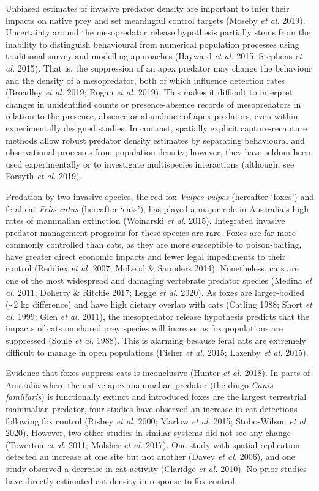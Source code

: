 \documentclass[]{elsarticle} %
\begin{document}
Unbiased estimates of invasive predator density are important to infer their impacts on native prey and set meaningful control targets (Moseby \emph{et al.} 2019). Uncertainty around the mesopredator release hypothesis partially stems from the inability to distinguish behavioural from numerical population processes using traditional survey and modelling approaches (Hayward \emph{et al.} 2015; Stephens \emph{et al.} 2015). That is, the suppression of an apex predator may change the behaviour and the density of a mesopredator, both of which influence detection rates (Broadley \emph{et al.} 2019; Rogan \emph{et al.} 2019). This makes it difficult to interpret changes in unidentified counts or presence-absence records of mesopredators in relation to the presence, absence or abundance of apex predators, even within experimentally designed studies. In contrast, spatially explicit capture-recapture methods allow robust predator density estimates by separating behavioural and observational processes from population density; however, they have seldom been used experimentally or to investigate multispecies interactions (although, see Forsyth \emph{et al.} 2019).

Predation by two invasive species, the red fox \emph{Vulpes vulpes} (hereafter `foxes') and feral cat \emph{Felis catus} (hereafter `cats'), has played a major role in Australia's high rates of mammalian extinction (Woinarski \emph{et al.} 2015). Integrated invasive predator management programs for these species are rare. Foxes are far more commonly controlled than cats, as they are more susceptible to poison-baiting, have greater direct economic impacts and fewer legal impediments to their control (Reddiex \emph{et al.} 2007; McLeod \& Saunders 2014). Nonetheless, cats are one of the most widespread and damaging vertebrate predator species (Medina \emph{et al.} 2011; Doherty \& Ritchie 2017; Legge \emph{et al.} 2020). As foxes are larger-bodied (\textasciitilde2 kg difference) and have high dietary overlap with cats (Catling 1988; Short \emph{et al.} 1999; Glen \emph{et al.} 2011), the mesopredator release hypothesis predicts that the impacts of cats on shared prey species will increase as fox populations are suppressed (Soulé \emph{et al.} 1988). This is alarming because feral cats are extremely difficult to manage in open populations (Fisher \emph{et al.} 2015; Lazenby \emph{et al.} 2015).

Evidence that foxes suppress cats is inconclusive (Hunter \emph{et al.} 2018). In parts of Australia where the native apex mammalian predator (the dingo \emph{Canis familiaris}) is functionally extinct and introduced foxes are the largest terrestrial mammalian predator, four studies have observed an increase in cat detections following fox control (Risbey \emph{et al.} 2000; Marlow \emph{et al.} 2015; Stobo-Wilson \emph{et al.} 2020). However, two other studies in similar systems did not see any change (Towerton \emph{et al.} 2011; Molsher \emph{et al.} 2017). One study with spatial replication detected an increase at one site but not another (Davey \emph{et al.} 2006), and one study observed a decrease in cat activity (Claridge \emph{et al.} 2010). No prior studies have directly estimated cat density in response to fox control.
\end{document}
